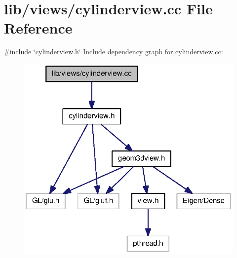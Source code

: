 \section{lib/views/cylinderview.cc \-File \-Reference}
\label{cylinderview_8cc}
{\ttfamily \#include \char`\"{}cylinderview.\-h\char`\"{}}\*
\-Include dependency graph for cylinderview.\-cc\-:\nopagebreak
\begin{figure}[H]
\begin{center}
\leavevmode
\includegraphics[width=322pt]{cylinderview_8cc__incl}
\end{center}
\end{figure}
